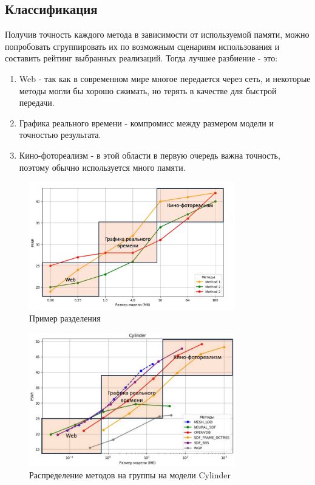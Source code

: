 \documentclass[a4paper,hidelinks,12pt]{article}
\begin{document}
\newpage

\subsection{Классификация}

Получив точность каждого метода в зависимости от используемой памяти, можно попробовать сгруппировать их по возможным сценариям 
использования и составить рейтинг выбранных реализаций. Тогда лучшее разбиение - это:
\begin{enumerate}
	\item Web - так как в современном мире многое передается через сеть, и некоторые методы могли бы хорошо сжимать, но терять в качестве для быстрой передачи.
	\item Графика реального времени - компромисс между размером модели и точностью результата.
	\item Кино-фотореализм - в этой области в первую очередь важна точность, поэтому обычно используется много памяти.
\end{enumerate}

\begin{figure}[ht]
  \centering
  \includegraphics[width=0.8\textwidth]{example2.jpeg}
  \caption{Пример разделения}
  \label{fig:example}
\end{figure}

\begin{figure}[ht]
  \centering
  \includegraphics[width=0.8\textwidth]{cylinder.png}
  \caption{Распределение методов на группы на модели Cylinder}
  \label{fig:example}
\end{figure}
\end{document}
